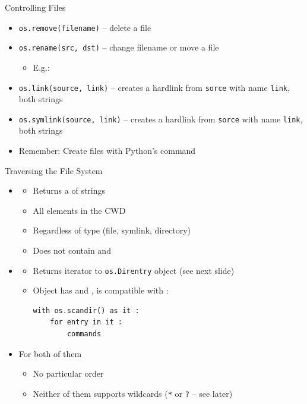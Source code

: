 
\begin{frame}{Controlling Files}
%
\begin{itemize}
\item \texttt{os.remove(filename)} -- delete a file
\item \texttt{os.rename(src, dst)} -- change filename or move a file
	\begin{itemize}
	\item E.\;g.: 
	\end{itemize}
\item \texttt{os.link(source, link)} -- creates a hardlink from \texttt{sorce} with name \texttt{link}, both strings
\item \texttt{os.symlink(source, link)} -- creates a hardlink from \texttt{sorce} with name \texttt{link}, both strings
\item Remember: Create files with Python's  command
\end{itemize}
%
\end{frame}


\begin{frame}[fragile]{Traversing the File System}
%
\begin{itemize}
\item {}
	\begin{itemize}
	\item Returns a  of strings
	\item All elements in the CWD
	\item Regardless of type (file, symlink, directory)
	\item Does not contain  and 
	\end{itemize}
\item {}
	\begin{itemize}
	\item Returns iterator to \texttt{os.Direntry} object (see next slide)
	\item Object has  and , \ie is compatible with :\\
\begin{verbatim}
with os.scandir() as it :
    for entry in it :
        commands
\end{verbatim}
	\end{itemize}
\item For both of them
	\begin{itemize}
	\item No particular order
	\item Neither of them supports wildcards (\texttt{*} or \texttt{?} -- see later)
	\end{itemize}
\end{itemize}
%
\end{frame}

